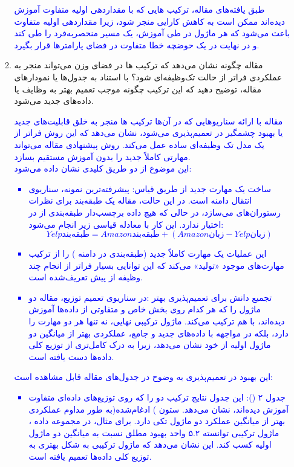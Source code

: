 \documentclass[12pt]{article}
\begin{document}
\begin{enumerate}
\begin{enumerate}
        \textcolor{blue}{
        طبق یافته‌های مقاله، ترکیب  هایی که با مقداردهی اولیه متفاوت آموزش دیده‌اند ممکن است به کاهش کارایی منجر شود، زیرا مقداردهی اولیه متفاوت باعث می‌شود که هر ماژول در طی آموزش، یک مسیر منحصربه‌فرد را طی کند و در نهایت در یک حوضچه خطا متفاوت در فضای پارامترها قرار بگیرد.
        }
        \item مقاله چگونه نشان می‌دهد که ترکیب  ها در فضای وزن می‌تواند منجر به عملکردی فراتر از حالت تک‌وظیفه‌ای شود؟ با استناد به جدول‌ها یا نمودارهای مقاله، توضیح دهید که این ترکیب چگونه موجب تعمیم بهتر به وظایف یا داده‌های جدید می‌شود.

        \textcolor{blue}{
        مقاله با ارائه سناریوهایی که در آن‌ها ترکیب  ها منجر به خلق قابلیت‌های جدید یا بهبود چشمگیر در تعمیم‌پذیری می‌شود، نشان می‌دهد که این روش فراتر از یک مدل تک وظیفه‌ای ساده عمل می‌کند. روش پیشنهادی مقاله می‌تواند مهارتی کاملاً جدید را بدون آموزش مستقیم بسازد.\\
        این موضوع از دو طریق کلیدی نشان داده می‌شود:\\
        \begin{itemize}
            \item ساخت یک مهارت جدید از طریق قیاس: پیشرفته‌ترین نمونه، سناریوی انتقال دامنه است. در این حالت، مقاله یک طبقه‌بند برای نظرات رستوران‌های  می‌سازد، در حالی که هیچ داده برچسب‌دار طبقه‌بندی از  در اختیار ندارد. این کار با معادله قیاسی زیر انجام می‌شود: 
            $$
            Yelp \text{طبقه‌بند}  = Amazon \text{طبقه‌بند}  + (Amazon \text{زبان}  - Yelp \text{زبان} )
            $$
            \item این عملیات یک مهارت کاملاً جدید (طبقه‌بندی در دامنه ) را از ترکیب مهارت‌های موجود «تولید» می‌کند که این توانایی بسیار فراتر از انجام چند وظیفه از پیش تعریف‌شده است.
            \item تجمیع دانش برای تعمیم‌پذیری بهتر :در سناریوی تعمیم توزیع، مقاله دو ماژول را که هر کدام روی بخش خاص و متفاوتی از داده‌ها آموزش دیده‌اند، با هم ترکیب می‌کند. ماژول ترکیبی نهایی، نه تنها هر دو مهارت را دارد، بلکه در مواجهه با داده‌های جدید و جامع، عملکردی بهتر از میانگین دو ماژول اولیه از خود نشان می‌دهد، زیرا به درک کامل‌تری از توزیع کلی داده‌ها دست یافته است.
        \end{itemize}
        این بهبود در تعمیم‌پذیری به وضوح در جدول‌های مقاله قابل مشاهده است:\\
        \begin{itemize}
            \item جدول ۲ (): این جدول نتایج ترکیب دو  را که روی توزیع‌های داده‌ای متفاوت آموزش دیده‌اند، نشان می‌دهد. ستون  ) ادغام‌شده(به طور مداوم عملکردی بهتر از میانگین عملکرد دو ماژول تکی دارد. برای مثال، در مجموعه داده ، ماژول ترکیبی  توانسته ۵.۲ واحد بهبود مطلق نسبت به میانگین دو ماژول اولیه کسب کند. این نشان می‌دهد که ماژول ترکیبی به شکل بهتری به توزیع کلی داده‌ها تعمیم یافته است.

\end{itemize}}
\end{enumerate}
\end{enumerate}
\end{document}
